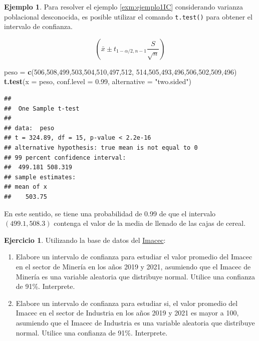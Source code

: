 \documentclass[
  11pt,
]{book}
\newenvironment{Shaded}{\begin{snugshade}}{\end{snugshade}}
\newcommand{\AttributeTok}[1]{\textcolor[rgb]{0.13,0.29,0.53}{#1}}
\newcommand{\DecValTok}[1]{\textcolor[rgb]{0.00,0.00,0.81}{#1}}
\newcommand{\FloatTok}[1]{\textcolor[rgb]{0.00,0.00,0.81}{#1}}
\newcommand{\FunctionTok}[1]{\textcolor[rgb]{0.13,0.29,0.53}{\textbf{#1}}}
\newcommand{\NormalTok}[1]{#1}
\newcommand{\OtherTok}[1]{\textcolor[rgb]{0.56,0.35,0.01}{#1}}
\newcommand{\StringTok}[1]{\textcolor[rgb]{0.31,0.60,0.02}{#1}}
\providecommand{\tightlist}{%
  \setlength{\itemsep}{0pt}\setlength{\parskip}{0pt}}
\theoremstyle{definition}
\theoremstyle{definition}
\newtheorem{example}{Ejemplo}[chapter]
\theoremstyle{definition}
\newtheorem{exercise}{Ejercicio}[chapter]
\theoremstyle{definition}
\theoremstyle{remark}
\begin{document}
\begin{example}
Para resolver el ejemplo \ref{exm:ejemplo1IC} considerando varianza poblacional desconocida, es posible utilizar el comando \texttt{t.test()} para obtener el intervalo de confianza.

\[\left(\bar{x} \pm t_{1-\alpha/2,n-1}\displaystyle\frac{S}{\sqrt{n}} \right)\]

\begin{Shaded}
\begin{Highlighting}[]
\NormalTok{peso }\OtherTok{=} \FunctionTok{c}\NormalTok{(}\DecValTok{506}\NormalTok{,}\DecValTok{508}\NormalTok{,}\DecValTok{499}\NormalTok{,}\DecValTok{503}\NormalTok{,}\DecValTok{504}\NormalTok{,}\DecValTok{510}\NormalTok{,}\DecValTok{497}\NormalTok{,}\DecValTok{512}\NormalTok{,}
         \DecValTok{514}\NormalTok{,}\DecValTok{505}\NormalTok{,}\DecValTok{493}\NormalTok{,}\DecValTok{496}\NormalTok{,}\DecValTok{506}\NormalTok{,}\DecValTok{502}\NormalTok{,}\DecValTok{509}\NormalTok{,}\DecValTok{496}\NormalTok{)}
\FunctionTok{t.test}\NormalTok{(}\AttributeTok{x =}\NormalTok{ peso, }\AttributeTok{conf.level =} \FloatTok{0.99}\NormalTok{, }\AttributeTok{alternative =} \StringTok{"two.sided"}\NormalTok{)}
\end{Highlighting}
\end{Shaded}

\begin{verbatim}
## 
##  One Sample t-test
## 
## data:  peso
## t = 324.89, df = 15, p-value < 2.2e-16
## alternative hypothesis: true mean is not equal to 0
## 99 percent confidence interval:
##  499.181 508.319
## sample estimates:
## mean of x 
##    503.75
\end{verbatim}

En este sentido, se tiene una probabilidad de 0.99 de que el intervalo \((499.1, 508.3)\) contenga el valor de la media de llenado de las cajas de cereal.
\end{example}

\begin{exercise}

Utilizando la base de datos del \hyperref[Imacec1]{Imacec}:

\begin{enumerate}
\def\labelenumi{\arabic{enumi}.}
\tightlist
\item
  Elabore un intervalo de confianza para estudiar el valor promedio del Imacec en el sector de Minería en los años 2019 y 2021, asumiendo que el Imacec de Minería es una variable aleatoria que distribuye normal. Utilice una confianza de 91\%. Interprete.
\item
  Elabore un intervalo de confianza para estudiar si, el valor promedio del Imacec en el sector de Industria en los años 2019 y 2021 es mayor a 100, asumiendo que el Imacec de Industria es una variable aleatoria que distribuye normal. Utilice una confianza de 91\%. Interprete.
\end{enumerate}

\end{exercise}
\end{document}
